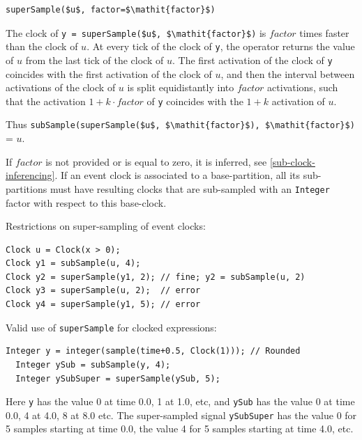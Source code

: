 \begin{operatordefinition}[superSample]
\begin{synopsis}\begin{lstlisting}
superSample($u$, factor=$\mathit{factor}$)
\end{lstlisting}\end{synopsis}
\begin{semantics}
The clock of \lstinline!y = superSample($u$, $\mathit{factor}$)! is $\mathit{factor}$ times faster than the clock of $u$.
At every tick of the clock of \lstinline!y!, the operator returns the value of $u$ from the last tick of the clock of $u$.
The first activation of the clock of \lstinline!y! coincides with the first activation of the clock of $u$, and then the interval between activations of the clock of $u$ is split equidistantly into $\mathit{factor}$ activations, such that the activation $1 + k \cdot \mathit{factor}$ of \lstinline!y! coincides with the $1 + k$ activation of $u$.
\begin{nonnormative}
Thus \lstinline!subSample(superSample($u$, $\mathit{factor}$), $\mathit{factor}$)! = $u$.
\end{nonnormative}
If $\mathit{factor}$ is not provided or is equal to zero, it is inferred, see \cref{sub-clock-inferencing}.
If an event clock is associated to a base-partition, all its sub-partitions must have resulting clocks that are sub-sampled with an \lstinline!Integer! factor with respect to this base-clock.

\begin{example}
Restrictions on super-sampling of event clocks:
\begin{lstlisting}[language=modelica]
Clock u = Clock(x > 0);
Clock y1 = subSample(u, 4);
Clock y2 = superSample(y1, 2); // fine; y2 = subSample(u, 2)
Clock y3 = superSample(u, 2);  // error
Clock y4 = superSample(y1, 5); // error
\end{lstlisting}
\end{example}

\begin{example}
Valid use of \lstinline!superSample! for clocked expressions:
\begin{lstlisting}[language=modelica]
  Integer y = integer(sample(time+0.5, Clock(1))); // Rounded
  Integer ySub = subSample(y, 4);
  Integer ySubSuper = superSample(ySub, 5);
\end{lstlisting}
Here \lstinline!y! has the value 0 at time 0.0, 1 at 1.0, etc, and \lstinline!ySub! has the value 0 at time 0.0, 4 at 4.0, 8 at 8.0 etc.
The super-sampled signal \lstinline!ySubSuper! has the value 0 for 5 samples starting at time 0.0, the value 4 for 5 samples starting at time 4.0, etc.
\end{example}
\end{semantics}
\end{operatordefinition}

